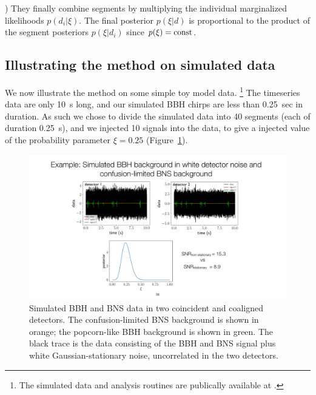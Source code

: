 \smallskip
{}) They finally combine segments
by multiplying the individual marginalized likelihoods
$p(d_i|\xi)$.
The final posterior $p(\xi|d)$ is
proportional to the product of the segment posteriors
$p(\xi|d_i)$ since $p(\xi)={\rm const}$.

\subsection{Illustrating the method on simulated data}

We now illustrate the method on some simple toy model
data.%
\footnote{The simulated data and analysis routines are
publically available at \cite{github}.}
The timeseries data are only 10~s long, and our simulated 
BBH chirps are less than 0.25~sec in duration.
As such we chose to divide the simulated data into 40
segments (each of duration 0.25~s), and we injected 10
signals into the data, to give a injected value of the 
probability parameter $\xi = 0.25$ 
(Figure~\ref{f:BBH-BNS-simulated-data}).
%
\begin{figure}[htbp!]
\begin{center}
\includegraphics[width=\textwidth]{Figures/BBH-BNS-simulated-data}
\caption{Simulated BBH and BNS data in two coincident and coaligned
detectors.
The confusion-limited BNS background is shown in orange;
the popcorn-like BBH background is shown in green.
The black trace is the data consisting of the BBH and BNS signal
plus white Gaussian-stationary noise, uncorrelated in the two
detectors.}
\label{f:BBH-BNS-simulated-data}
\end{center}
\end{figure}

